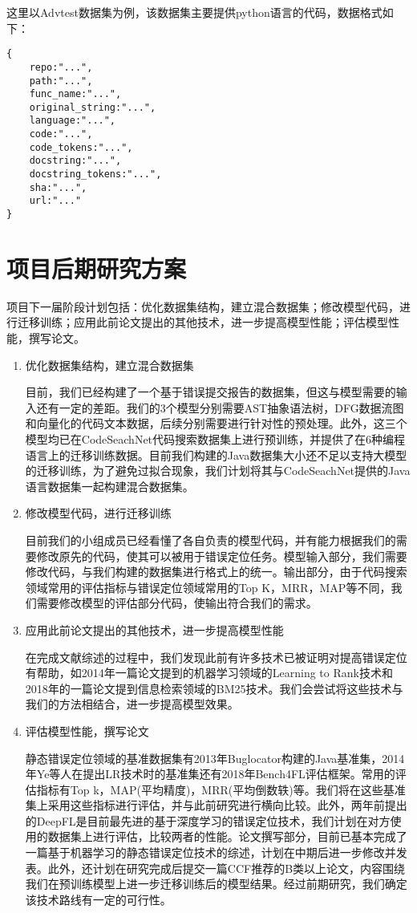 \documentclass[12pt]{article}
\begin{document}
这里以Advtest数据集为例，该数据集主要提供python语言的代码，数据格式如下：

\begin{lstlisting}
{   
    repo:"...",
    path:"...",
    func_name:"...",
    original_string:"...",
    language:"...",
    code:"...",
    code_tokens:"...",
    docstring:"...",
    docstring_tokens:"...",
    sha:"...",
    url:"..."
}
\end{lstlisting}
\clearpage
\section{项目后期研究方案}
项目下一届阶段计划包括：优化数据集结构，建立混合数据集；修改模型代码，进行迁移训练；应用此前论文提出的其他技术，进一步提高模型性能；评估模型性能，撰写论文。
\begin{enumerate}
      \item
            优化数据集结构，建立混合数据集

            目前，我们已经构建了一个基于错误提交报告的数据集，但这与模型需要的输入还有一定的差距。我们的3个模型分别需要AST抽象语法树，DFG数据流图和向量化的代码文本数据，后续分别需要进行针对性的预处理。此外，这三个模型均已在CodeSeachNet代码搜索数据集上进行预训练，并提供了在6种编程语言上的迁移训练数据。目前我们构建的Java数据集大小还不足以支持大模型的迁移训练，为了避免过拟合现象，我们计划将其与CodeSeachNet提供的Java语言数据集一起构建混合数据集。
      \item
            修改模型代码，进行迁移训练

            目前我们的小组成员已经看懂了各自负责的模型代码，并有能力根据我们的需要修改原先的代码，使其可以被用于错误定位任务。模型输入部分，我们需要修改代码，与我们构建的数据集进行格式上的统一。输出部分，由于代码搜索领域常用的评估指标与错误定位领域常用的Top K，MRR，MAP等不同，我们需要修改模型的评估部分代码，使输出符合我们的需求。
      \item
            应用此前论文提出的其他技术，进一步提高模型性能

            在完成文献综述的过程中，我们发现此前有许多技术已被证明对提高错误定位有帮助，如2014年一篇论文提到的机器学习领域的Learning to Rank技术和2018年的一篇论文提到信息检索领域的BM25技术。我们会尝试将这些技术与我们的方法相结合，进一步提高模型效果。
      \item
            评估模型性能，撰写论文

            静态错误定位领域的基准数据集有2013年Buglocator构建的Java基准集，2014年Ye等人在提出LR技术时的基准集还有2018年Bench4FL评估框架。常用的评估指标有Top k，MAP(平均精度)，MRR(平均倒数轶)等。我们将在这些基准集上采用这些指标进行评估，并与此前研究进行横向比较。此外，两年前提出的DeepFL是目前最先进的基于深度学习的错误定位技术，我们计划在对方使用的数据集上进行评估，比较两者的性能。论文撰写部分，目前已基本完成了一篇基于机器学习的静态错误定位技术的综述，计划在中期后进一步修改并发表。此外，还计划在研究完成后提交一篇CCF推荐的B类以上论文，内容围绕我们在预训练模型上进一步迁移训练后的模型结果。经过前期研究，我们确定该技术路线有一定的可行性。
\end{enumerate}
\clearpage
\end{document}
